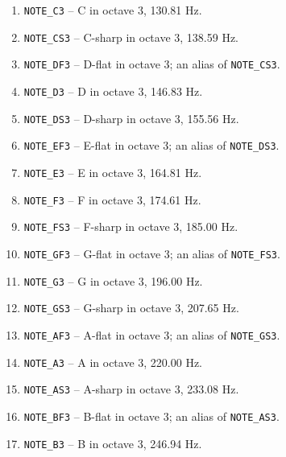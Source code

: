 \begin{enumerate}
    \item \texttt{NOTE\_C3} -- C in octave 3, 130.81 Hz.
    \item \texttt{NOTE\_CS3} -- C-sharp in octave 3, 138.59 Hz.
    \item \texttt{NOTE\_DF3} -- D-flat in octave 3; an alias of \texttt{NOTE\_CS3}.
    \item \texttt{NOTE\_D3} -- D in octave 3, 146.83 Hz.
    \item \texttt{NOTE\_DS3} -- D-sharp in octave 3, 155.56 Hz.
    \item \texttt{NOTE\_EF3} -- E-flat in octave 3; an alias of \texttt{NOTE\_DS3}.
    \item \texttt{NOTE\_E3} -- E in octave 3, 164.81 Hz.
    \item \texttt{NOTE\_F3} -- F in octave 3, 174.61 Hz.
    \item \texttt{NOTE\_FS3} -- F-sharp in octave 3, 185.00 Hz.
    \item \texttt{NOTE\_GF3} -- G-flat in octave 3; an alias of \texttt{NOTE\_FS3}.
    \item \texttt{NOTE\_G3} -- G in octave 3, 196.00 Hz.
    \item \texttt{NOTE\_GS3} -- G-sharp in octave 3, 207.65 Hz.
    \item \texttt{NOTE\_AF3} -- A-flat in octave 3; an alias of \texttt{NOTE\_GS3}.
    \item \texttt{NOTE\_A3} -- A in octave 3, 220.00 Hz.
    \item \texttt{NOTE\_AS3} -- A-sharp in octave 3, 233.08 Hz.
    \item \texttt{NOTE\_BF3} -- B-flat in octave 3; an alias of \texttt{NOTE\_AS3}.
    \item \texttt{NOTE\_B3} -- B in octave 3, 246.94 Hz.


\end{enumerate}
